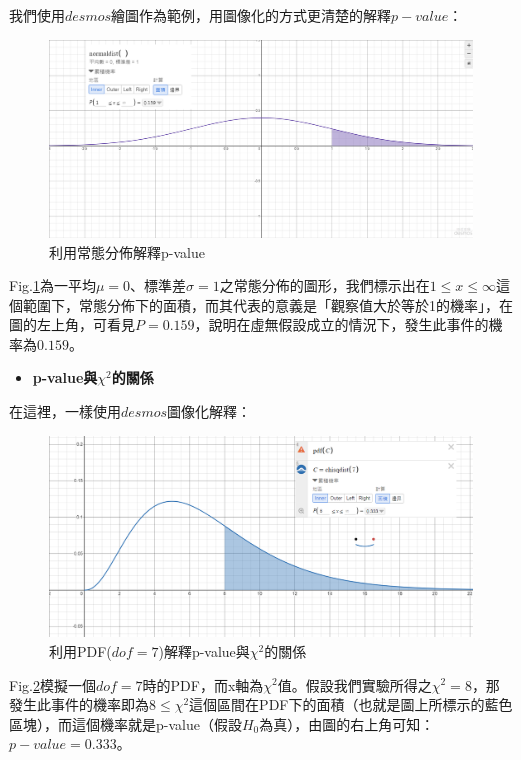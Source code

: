 \documentclass[12pt,a4paper]{article}
\begin{document}
\begin{CJK}{UTF8}{bkai}
\clearpage

我們使用$desmos$繪圖作為範例，用圖像化的方式更清楚的解釋$p-value$：
\begin{figure}[h]
    \centering
    \includegraphics[width=0.8\linewidth]{figures/RF/desmos.png}
    \caption{利用常態分佈解釋p-value}
    \label{fig:desmos_1}
\end{figure}


Fig.\ref{fig:desmos_1}為一平均$\mu=0$、標準差$\sigma=1$之常態分佈的圖形，我們標示出在$1\le x\le \infty$這個範圍下，常態分佈下的面積，而其代表的意義是「觀察值大於等於1的機率」，在圖的左上角，可看見$P=0.159$，說明在虛無假設成立的情況下，發生此事件的機率為$0.159$。

\begin{itemize}
    \item \textbf{p-value與$\chi^2$的關係}
\end{itemize}

在這裡，一樣使用$desmos$圖像化解釋：
\begin{figure}[h]
    \centering
    \includegraphics[width=0.8\linewidth]{figures/RF/desmos_3.png}
    \caption{利用PDF($dof=7$)解釋p-value與$\chi^2$的關係}
    \label{fig:desmos_2}
\end{figure}

Fig.\ref{fig:desmos_2}模擬一個$dof=7$時的PDF，而x軸為$\chi^2$值。假設我們實驗所得之$\chi^2=8$，那發生此事件的機率即為$8\le\chi^2$這個區間在PDF下的面積（也就是圖上所標示的藍色區塊），而這個機率就是p-value（假設$H_0$為真），由圖的右上角可知：$p-value=0.333$。\\


\end{CJK}
\end{document}
